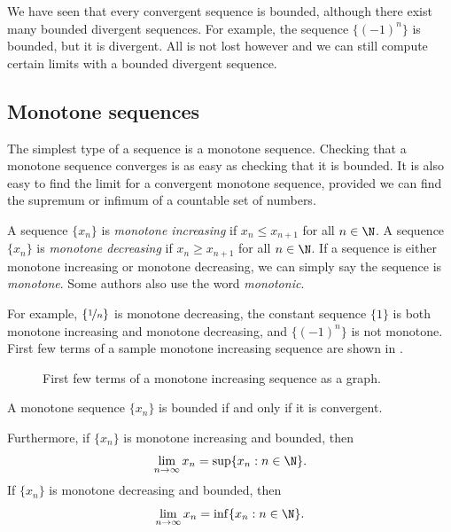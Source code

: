 \documentclass[12pt]{book}
\begin{document}
We have seen that every convergent sequence is bounded,
although there exist many bounded divergent sequences.
For example,
the sequence $\{ {(-1)}^n \}$ is bounded,
but it is divergent.
All is not lost however and we can
still compute certain limits with a bounded divergent sequence.

\subsection*{Monotone sequences}


The simplest type of a sequence is a monotone sequence.
Checking that
a monotone sequence converges is as easy as checking that it is bounded.
It is also easy to find
the limit for a convergent
monotone sequence, provided we can find the supremum or infimum
of a countable set of numbers.

\begin{defn}
A sequence $\{ x_n \}$ is \emph{monotone increasing} if $x_n \leq x_{n+1}$ for all $n \in \N$.  
%
A sequence $\{ x_n \}$ is \emph{monotone decreasing} if $x_n \geq x_{n+1}$ for all $n \in \N$.  
%
If a sequence is either monotone increasing or monotone decreasing, we
can simply say the sequence is \emph{monotone}.
Some
authors also use the word \emph{monotonic}.
\end{defn}

For example, $\{ \nicefrac{1}{n} \}$ is monotone decreasing,
the constant sequence $\{ 1 \}$ is both monotone increasing and monotone
decreasing, and $\{ {(-1)}^n \}$ is not monotone.
First few terms of a sample monotone increasing sequence
are shown in 
.

\begin{figure}[h!t]
\begin{center}

\caption{First few terms of a monotone increasing sequence as a
graph.\label{figsequenceincreasing}}
\end{center}
\end{figure}

\begin{thm} \label{thm:monotoneconv}
A monotone sequence $\{ x_n \}$ is bounded if and only if it is convergent.

Furthermore, if $\{ x_n \}$ is monotone increasing and bounded, then
\begin{equation*}
\lim_{n\to \infty} x_n = \sup \{ x_n : n \in \N \} .
\end{equation*}
If $\{ x_n \}$ is monotone decreasing and bounded, then
\begin{equation*}
\lim_{n\to \infty} x_n = \inf \{ x_n : n \in \N \} .
\end{equation*}
\end{thm}
\end{document}
